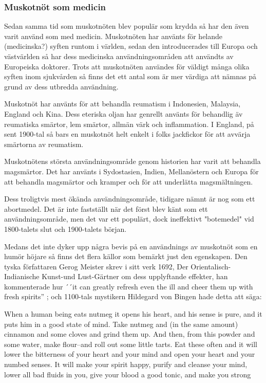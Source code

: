 \subsubsection{Muskotnöt som medicin}
Sedan samma tid som muskotnöten blev populär som krydda så har den även
varit använd som med medicin.
Muskotnöten har använts för helande (medicinska?) syften runtom i världen,
sedan den introducerades till Europa och västvärlden så har
dess medicinska användningsområden att användts av Europeiska doktorer.
Trots att muskotnöten användes för väldigt många olika syften inom sjukvården
så finns det ett antal som är mer
värdiga att nämnas på grund av dess utbredda användning.

Muskotnöt har använts för att behandla reumatism i Indonesien, Malaysia, England och Kina. Dess eteriska oljan har genrellt använts för behandlig äv reumatiska smärtor, lem smärtor, allmän värk och inflammation.
I England, på sent 1900-tal så bars en muskotnöt helt enkelt i folks jackfickor för att avvärja smärtorna av reumatism. \cite{RudgleyR}

Muskotnötens största användningsområde genom historien har varit att behandla magsmärtor.
Det har använts i Sydostasien, Indien, Mellanöstern och Europa för att behandla magsmärtor och kramper och för att underlätta magsmältningen.

Dess troligtvis mest ökända användningsområde, tidigare nämnt är nog som ett abortmedel. Det är inte fastställt när det först blev känt som ett användningsområde, men det var ett populärt, dock ineffektivt "botemedel" vid 1800-talets slut och 1900-talets början.

Medans det inte dyker upp några bevis på en användnings av muskotnöt som en humör höjare så finns det flera källor som bemärkt just den egenskapen.
Den tyska författaren Gerog Meister skrev i sitt verk 1692,
Der Orientalisch-Indianische Kunst-und Lust-Gärtner om dess upplyftande effekter, han kommenterade hur ´´it can greatly
refresh even the ill and cheer them up with fresh spirits'' \cite{ratsch2005encyclopedia}; och 1100-tals mystikern Hildegard von Bingen hade detta att säga:

\begin{displayquote}

When a human being eats nutmeg it opens his heart, and his sense is pure, and it
puts him in a good state of mind. Take nutmeg and (in the same amount) cinnamon
and some cloves and grind them up. And then, from this powder and some water,
make flour--and roll out some little tarts. Eat these often and it will lower the
bitterness of your heart and your mind and open your heart and your numbed
senses. It will make your spirit happy, purify and cleanse your mind, lower all bad
fluids in you, give your blood a good tonic, and make you strong \cite{ratsch2006pagan}

\end{displayquote}

